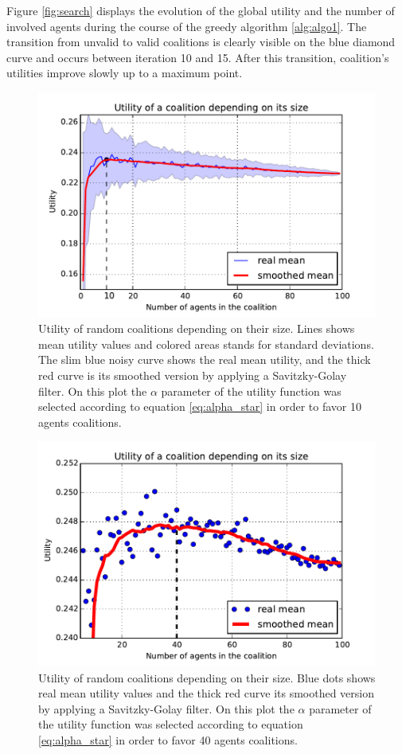\documentclass[conference]{IEEEtran}
\begin{document}
Figure \ref{fig:search} displays the evolution of the global utility and the number of involved agents during the course of the greedy algorithm \ref{alg:algo1}. The transition from unvalid to valid coalitions is clearly visible on the blue diamond curve and occurs between iteration 10 and 15. After this transition, coalition's utilities improve slowly up to a maximum point. 

\begin{figure}
\includegraphics[scale=.6]{real_utility.pdf}
\caption{Utility of random coalitions depending on their size. Lines shows mean utility values and colored areas stands for standard deviations. The slim blue noisy curve shows the real mean utility, and the thick red curve is its smoothed version by applying a Savitzky-Golay filter. On this plot the $ \alpha $ parameter of the utility function was selected according to equation \ref{eq:alpha_star} in order to favor 10 agents coalitions.}
\label{fig:real_utility}
\end{figure}

\begin{figure}
\includegraphics[scale=.6]{real_utility_2.pdf}
\caption{Utility of random coalitions depending on their size. Blue dots shows real mean utility values and the thick red curve its smoothed version by applying a Savitzky-Golay filter. On this plot the $ \alpha $ parameter of the utility function was selected according to equation \ref{eq:alpha_star} in order to favor 40 agents coalitions.}
\label{fig:real_utility2}
\end{figure}
\end{document}
